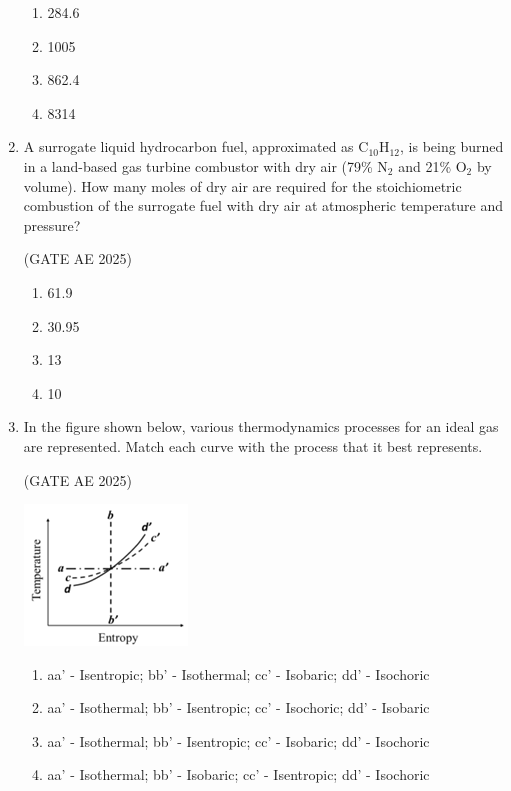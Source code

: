 \documentclass[journal,12pt,onecolumn]{IEEEtran}
\theoremstyle{remark}
\begin{document}
\begin{flushleft}
\begin{enumerate}
\begin{enumerate}
    \item 284.6
    \item 1005
    \item 862.4
    \item 8314
\end{enumerate}
   
\item A surrogate liquid hydrocarbon fuel, approximated as C$_{10}$H$_{12}$, is being burned in a land-based gas turbine combustor with dry air (79\% N$_2$ and 21\% O$_2$ by volume). How many moles of dry air are required for the stoichiometric combustion of the surrogate fuel with dry air at atmospheric temperature and pressure?

\hfill (GATE AE 2025)

\begin{enumerate}
    \item 61.9
    \item 30.95
    \item 13
    \item 10
\end{enumerate}

\item In the figure shown below, various thermodynamics processes for an ideal gas are represented. Match each curve with the process that it best represents.

\hfill (GATE AE 2025)

\begin{center}
\includegraphics[width=0.5\columnwidth]{figs/entropy.png}
\end{center}

\begin{enumerate}
    \item aa' - Isentropic; bb' - Isothermal; cc' - Isobaric; dd' - Isochoric
    \item aa' - Isothermal; bb' - Isentropic; cc' - Isochoric; dd' - Isobaric
    \item aa' - Isothermal; bb' - Isentropic; cc' - Isobaric; dd' - Isochoric
    \item aa' - Isothermal; bb' - Isobaric; cc' - Isentropic; dd' - Isochoric
\end{enumerate}
    

\end{enumerate}
\end{flushleft}
\end{document}
